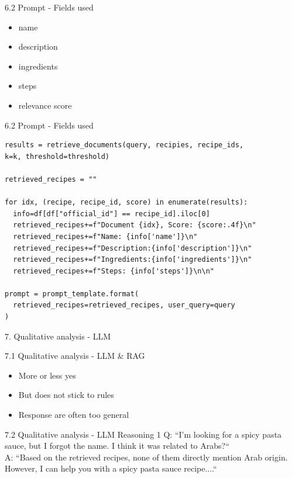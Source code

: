 \documentclass{beamer}
\begin{document}
\begin{frame}{6.2 Prompt - Fields used}
  \begin{itemize}
    \item name
    \item description
    \item ingredients
    \item steps
    \item relevance score
  \end{itemize}
\end{frame}

\begin{frame}[fragile]{6.2 Prompt - Fields used}
  \begin{verbatim}
results = retrieve_documents(query, recipies, recipe_ids, 
k=k, threshold=threshold)

retrieved_recipes = ""

for idx, (recipe, recipe_id, score) in enumerate(results):
  info=df[df["official_id"] == recipe_id].iloc[0]
  retrieved_recipes+=f"Document {idx}, Score: {score:.4f}\n"
  retrieved_recipes+=f"Name: {info['name']}\n"
  retrieved_recipes+=f"Description:{info['description']}\n"
  retrieved_recipes+=f"Ingredients:{info['ingredients']}\n"
  retrieved_recipes+=f"Steps: {info['steps']}\n\n"

prompt = prompt_template.format(
  retrieved_recipes=retrieved_recipes, user_query=query
)
  \end{verbatim}
\end{frame}

\begin{frame}{7. Qualitative analysis - LLM}
\end{frame}

\begin{frame}{7.1 Qualitative analysis - LLM \& RAG}
  \begin{itemize}
    \item More or less yes
    \item But does not stick to rules
    \item Response are often too general
  \end{itemize}
\end{frame}
\begin{frame}{7.2 Qualitative analysis - LLM Reasoning 1}
  Q: ``I'm looking for a spicy pasta sauce, but I forgot the name. I think it was related to Arabs?``\\
  A: ``Based on the retrieved recipes, none of them directly mention Arab origin. However,
  I can help you with a spicy pasta sauce recipe....``
\end{frame}
\end{document}
